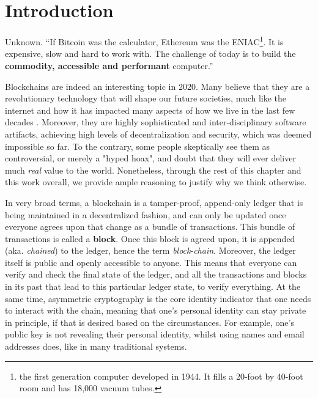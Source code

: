 \chapter{Introduction} \label{chap:intoroduction}

\ifpdf
    \graphicspath{{1_introduction/figures/PNG/}{1_introduction/figures/PDF/}{1_introduction/figures/}}
\else
    \graphicspath{{1_introduction/figures/EPS/}{1_introduction/figures/}}
\fi

\begin{chapquote}{Unknown.}
``If Bitcoin was the calculator, Ethereum was the ENIAC\footnote{the first generation computer
developed in 1944. It fills a 20-foot by 40-foot room and has 18,000 vacuum tubes.}. It is
expensive, slow and hard to work with. The challenge of today is to build the \textbf{commodity,
accessible and performant} computer.''
\end{chapquote}


Blockchains are indeed an interesting topic in 2020. Many believe that they are a revolutionary
technology that will shape our future societies, much like the internet and how it has impacted many
aspects of how we live in the last few decades \cite{pirrongWillBlockchainBe2019}. Moreover, they
are highly sophisticated and inter-disciplinary software artifacts, achieving high levels of
decentralization and security, which was deemed impossible so far. To the contrary, some people
skeptically see them as controversial, or merely a "hyped hoax", and doubt that they will ever
deliver much \textit{real} value to the world. Nonetheless, through the rest of this chapter and this work
overall, we provide ample reasoning to justify why we think otherwise.

In very broad terms, a blockchain is a tamper-proof, append-only ledger that is being maintained in
a decentralized fashion, and can only be updated once everyone agrees upon that change as a bundle
of transactions. This bundle of transactions is called a \textbf{block}. Once this block is agreed
upon, it is appended (aka. \textit{chained}) to the ledger, hence the term
\textit{block}-\textit{chain}. Moreover, the ledger itself is public and openly accessible to
anyone. This means that everyone can verify and check the final state of the ledger, and all the
transactions and blocks in its past that lead to this particular ledger state, to verify everything.
At the same time, asymmetric cryptography is the core identity indicator that one needs to interact
with the chain, meaning that one's personal identity can stay private in principle, if that is
desired based on the circumstances. For example, one's public key is not revealing their personal
identity, whilst using names and email addresses does, like in many traditional systems.

